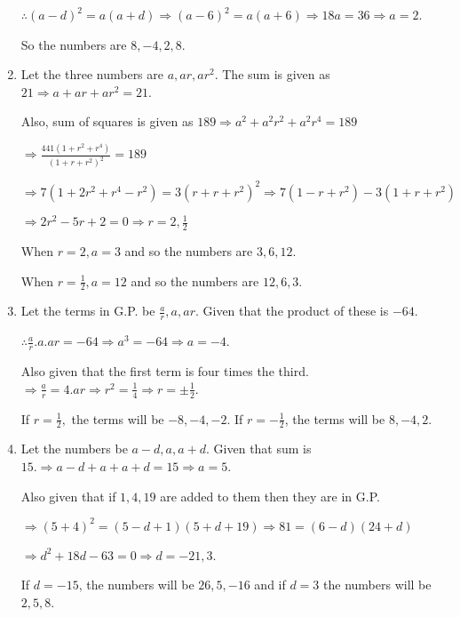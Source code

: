 \begin{enumerate}
  $\therefore (a - d)^2 = a(a + d)\Rightarrow (a - 6)^2 = a(a + 6) \Rightarrow 18a = 36 \Rightarrow a = 2$.

  So the numbers are $8, -4, 2, 8$.
\item Let the three numbers are $a, ar, ar^2$. The sum is given as $21 \Rightarrow a + ar + ar^2 = 21$.

  Also, sum of squares is given as $189 \Rightarrow a^2 + a^2r^2 + a^2r^4 = 189$

  $\Rightarrow \frac{441(1 + r^2 + r^4)}{(1 + r + r^2)^2} = 189$

  $\Rightarrow 7(1 + 2r^2 + r^4 - r^2) = 3(r + r + r^2)^2 \Rightarrow 7(1 - r + r^2) - 3(1 + r + r^2)$

  $\Rightarrow 2r^2 - 5r + 2 = 0 \Rightarrow r = 2, \frac{1}{2}$

  When $r = 2, a = 3$ and so the numbers are $3, 6, 12$.

  When $r = \frac{1}{2}, a = 12$ and so the numbers are $12, 6, 3$.
\item Let the terms in G.P. be $\frac{a}{r}, a, ar$. Given that the product of these is $-64$.

  $\therefore \frac{a}{r}.a.ar = -64 \Rightarrow a^3 = -64 \Rightarrow a = -4$.

  Also given that the first term is four times the third. $\Rightarrow \frac{a}{r} = 4.ar \Rightarrow r^2 = \frac{1}{4} \Rightarrow r = \pm\frac{1}{2}$.

  If $r = \frac{1}{2},$ the terms will be $-8, -4, -2$. If $r = -\frac{1}{2}$, the terms will be $8, -4, 2$.
\item Let the numbers be $a - d, a, a + d$. Given that sum is $15. \Rightarrow a - d + a + a + d = 15 \Rightarrow a = 5$.

  Also given that if $1, 4, 19$ are added to them then they are in G.P.

  $\Rightarrow (5 + 4)^2 = (5 - d + 1)(5 + d + 19) \Rightarrow 81 = (6 - d)(24 + d)$

  $\Rightarrow d^2 + 18d - 63 = 0 \Rightarrow d = -21, 3$.

  If $d = -15$, the numbers will be $26, 5, -16$ and if $d = 3$ the numbers will be $2, 5, 8$.
\end{enumerate}
